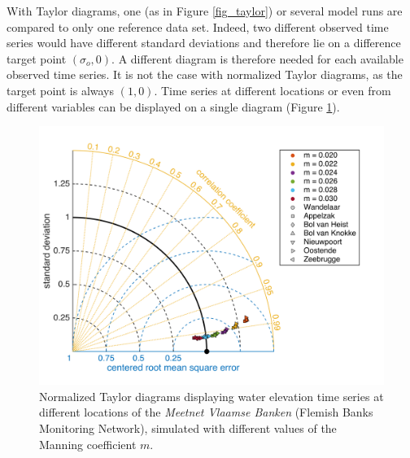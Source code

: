 \documentclass{article}
\begin{document}
With Taylor diagrams, one (as in Figure \ref{fig_taylor}) or several model runs are compared to only one reference data set. Indeed, two different observed time series would have different standard deviations and therefore lie on a difference target point $(\sigma_o, 0)$. A different diagram is therefore needed for each available observed time series. It is not the case with normalized Taylor diagrams, as the target point is always $(1, 0)$. Time series at different locations or even from different variables can be displayed on a single diagram (Figure \ref{fig_norm_taylor}).

\begin{figure}
  \centering
  \includegraphics[width = \textwidth]{figures/norm_taylor.png}
  \caption{Normalized Taylor diagrams displaying water elevation time series at different locations of the \textit{Meetnet Vlaamse Banken} (Flemish Banks Monitoring Network), simulated with different values of the Manning coefficient $m$.}
  \label{fig_norm_taylor}
\end{figure}




\end{document}
